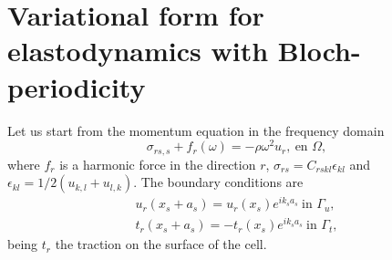 \section{Variational form for elastodynamics with Bloch-periodicity}
Let us start from the momentum equation in the frequency domain
\[\sigma_{rs,s}+f_{r}(\omega) = -\rho \omega^2 u_r,\ \text{en } \Omega,\]
where $f_r$ is a harmonic force in the direction $r$, $\sigma_{rs}=C_{rskl}\epsilon_{kl}$ and $\epsilon_{kl} =1/2(u_{k,l} + u_{l,k})$. The boundary conditions are
\begin{subequations}
\begin{align}
u_r(x_s +a_s)=u_r(x_s)e^{i k_s a_s}\ \text{in } \Gamma_u, \label{eq:disp_bloch}\\
t_r(x_s +a_s)=-t_r(x_s)e^{i k_s a_s}\ \text{in } \Gamma_t, \label{eq:force_bloch}
\end{align}
\label{eq:bloch_cond}
\end{subequations}
being $t_{r}$ the traction on the surface of the cell.

